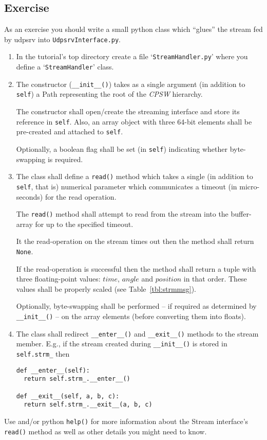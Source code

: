 \documentclass[10pt]{article}
\newcommand{\ita}[1]{\emph{#1}}
\newcommand{\cpsw}      {\ita {CPSW}}
\newcommand{\Path}      {{Path}}
\newcommand{\py}        {python}
\newcommand{\udps}      {udpsrv}
\newcommand{\cod}[1] {{\tt#1}}
\begin{document}
\subsection{Exercise}
As an exercise you should write a small \py{} class which ``glues'' the
stream fed by \udps{} into \cod{UdpsrvInterface.py}.
\begin{enumerate}
\item In the tutorial's top directory create a file `\cod{StreamHandler.py}' where you
      define a `\cod{StreamHandler}' class.
\item The constructor (\cod{\_\_init\_\_()}) takes as a single argument (in addition
      to \cod{self}) a \Path{} representing the root of the \cpsw{} hierarchy.

      The constructor shall open/create the streaming interface and store its
      reference in \cod{self}. Also, an array object with three 64-bit elements
      shall be pre-created and attached to \cod{self}.

      Optionally, a boolean flag shall be set (in \cod{self}) indicating whether
      byte-swapping is required.
\item The class shall define a \cod{read()} method which takes a single (in
      addition to \cod{self}, that is) numerical parameter which communicates
      a timeout (in micro-seconds) for the read operation.

      The \cod{read()} method shall attempt to read from the stream into
      the buffer-array for up to the specified timeout.

      It the read-operation on the stream times out then the method
      shall return \cod{None}.

      If the read-operation is successful then the method shall return a tuple with
      three floating-point values: $time$, $angle$ and $position$ in that order. 
      These values shall be properly scaled (see Table~\ref{tbl:strmmsg}).

      Optionally, byte-swapping shall be performed -- if required as determined
      by \cod{\_\_init\_\_()} -- on the array elements (before converting them into
      floats).
\item The class shall redirect \cod{\_\_enter\_\_()} and \cod{\_\_exit\_\_()}
      methods to the stream member. E.g., if the stream created during
      \cod{\_\_init\_\_()} is stored in \cod{self.strm\_} then
      \begin{verbatim}
def __enter__(self):
  return self.strm_.__enter__()

def __exit__(self, a, b, c):
  return self.strm_.__exit__(a, b, c)
      \end{verbatim}
\end{enumerate}
Use \cite{userapi} and/or \py{} \cod{help()} for more information about the Stream
interface's \cod{read()} method as well as other details you might need to know.
\end{document}
